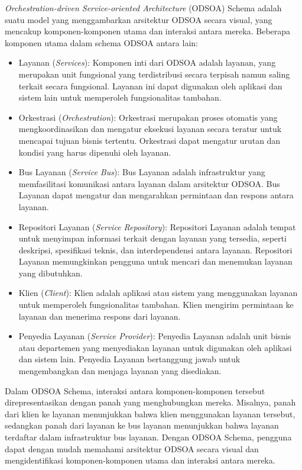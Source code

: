 \textit{Orchestration-driven Service-oriented Architecture} (ODSOA) Schema adalah suatu model yang menggambarkan arsitektur ODSOA secara visual, yang mencakup komponen-komponen utama dan interaksi antara mereka. Beberapa komponen utama dalam schema ODSOA antara lain:
	\begin{itemize}
	\item Layanan (\textit{Services}): Komponen inti dari ODSOA adalah layanan, yang merupakan unit fungsional yang terdistribusi secara terpisah namun saling terkait secara fungsional. Layanan ini dapat digunakan oleh aplikasi dan sistem lain untuk memperoleh fungsionalitas tambahan.
	\item Orkestrasi (\textit{Orchestration}): Orkestrasi merupakan proses otomatis yang mengkoordinasikan dan mengatur eksekusi layanan secara teratur untuk mencapai tujuan bisnis tertentu. Orkestrasi dapat mengatur urutan dan kondisi yang harus dipenuhi oleh layanan.
	\item Bus Layanan (\textit{Service Bus}): Bus Layanan adalah infrastruktur yang memfasilitasi komunikasi antara layanan dalam arsitektur ODSOA. Bus Layanan dapat mengatur dan mengarahkan permintaan dan respons antara layanan.
	\item Repositori Layanan (\textit{Service Repository}): Repositori Layanan adalah tempat untuk menyimpan informasi terkait dengan layanan yang tersedia, seperti deskripsi, spesifikasi teknis, dan interdependensi antara layanan. Repositori Layanan memungkinkan pengguna untuk mencari dan menemukan layanan yang dibutuhkan.
	\item Klien (\textit{Client}): Klien adalah aplikasi atau sistem yang menggunakan layanan untuk memperoleh fungsionalitas tambahan. Klien mengirim permintaan ke layanan dan menerima respons dari layanan.
	\item Penyedia Layanan (\textit{Service Provider}): Penyedia Layanan adalah unit bisnis atau departemen yang menyediakan layanan untuk digunakan oleh aplikasi dan sistem lain. Penyedia Layanan bertanggung jawab untuk mengembangkan dan menjaga layanan yang disediakan.
	\end{itemize}
Dalam ODSOA Schema, interaksi antara komponen-komponen tersebut direpresentasikan dengan panah yang menghubungkan mereka. Misalnya, panah dari klien ke layanan menunjukkan bahwa klien menggunakan layanan tersebut, sedangkan panah dari layanan ke bus layanan menunjukkan bahwa layanan terdaftar dalam infrastruktur bus layanan. Dengan ODSOA Schema, pengguna dapat dengan mudah memahami arsitektur ODSOA secara visual dan mengidentifikasi komponen-komponen utama dan interaksi antara mereka.

